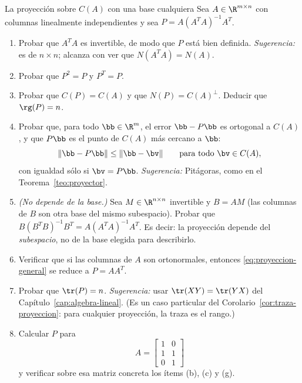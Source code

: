 \begin{entrega}{La proyección sobre $C(A)$ con una base cualquiera}
\label{ent:proyeccion}
Sea $A\in\R^{m\times n}$ con columnas linealmente independientes y sea
$P=A(A^TA)^{-1}A^T$.

\begin{enumerate}[label=\textbf{(\alph*)},itemsep=3pt,topsep=4pt]
\item Probar que $A^TA$ es invertible, de modo que $P$ está bien definida.
\emph{Sugerencia:} es de $n\times n$; alcanza con ver que $N(A^TA)=N(A)$.

\item Probar que $P^2=P$ y $P^T=P$.

\item Probar que $C(P)=C(A)$ y que $N(P)=C(A)^{\perp}$. Deducir que
$\rg(P)=n$.

\item Probar que, para todo $\bb\in\R^m$, el error $\bb-P\bb$ es ortogonal a
$C(A)$, y que $P\bb$ es el punto de $C(A)$ más cercano a $\bb$:
\[
\|\bb-P\bb\| \le \|\bb-\bv\| \qquad\text{para todo } \bv\in C(A),
\]
con igualdad sólo si $\bv=P\bb$. \emph{Sugerencia:} Pitágoras, como en el
Teorema~\ref{teo:proyector}.

\item \emph{(No depende de la base.)} Sea $M\in\R^{n\times n}$ invertible y
$B=AM$ (las columnas de $B$ son otra base del mismo subespacio). Probar que
$B(B^TB)^{-1}B^T = A(A^TA)^{-1}A^T$. Es decir: la proyección depende del
\emph{subespacio}, no de la base elegida para describirlo.

\item Verificar que si las columnas de $A$ son ortonormales, entonces
\eqref{eq:proyeccion-general} se reduce a $P=AA^T$.

\item Probar que $\tr(P)=n$. \emph{Sugerencia:} usar
$\tr(XY)=\tr(YX)$ del Capítulo~\ref{cap:algebra-lineal}. (Es un caso
particular del Corolario~\ref{cor:traza-proyeccion}: para cualquier
proyección, la traza es el rango.)

\item Calcular $P$ para
\[
A=\begin{bmatrix} 1&0\\ 1&1\\ 0&1\end{bmatrix}
\]
y verificar sobre esa matriz concreta los ítems (b), (c) y (g).
\end{enumerate}

\medskip
{}
\end{entrega}
